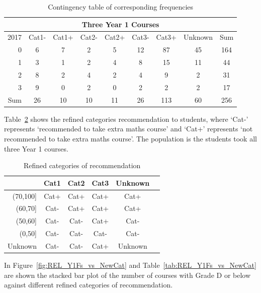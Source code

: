\documentclass[a4paper]{report}
\begin{document}
\begin{table}[H]
  \centering
  \begin{tabular}{r|ccccccc|c}
    \hline
    \multicolumn{9}{c}{\textbf{Three Year 1 Courses}} \\
    \hline
   2017 & Cat1- & Cat1+ & Cat2- & Cat2+ & Cat3- & Cat3+ & Unknown & Sum \\ 
    \hline
  0 & 6 & 7 & 2 & 5 & 12 & 87 & 45 & 164 \\ 
    1 & 3 & 1 & 2 & 4 & 8 & 15 & 11 & 44 \\ 
    2 & 8 & 2 & 4 & 2 & 4 & 9 & 2 & 31 \\ 
    3 & 9 & 0 & 2 & 0 & 2 & 2 & 2 & 17 \\ 
    \hline
    Sum & 26 & 10 & 10 & 11 & 26 & 113 & 60 & 256 \\ 
     \hline
  \end{tabular}
  \caption{\label{tab:REL_Y1Fs_vs_NewCat_all}Contingency table of corresponding frequencies}
\end{table}

Table~\ref{tab:REL_refine} shows the refined categories recommendation to students, where `Cat-' represents `recommended to take extra maths course' and `Cat+' represents `not recommended to take extra maths course'. The population is the students took all three Year 1 courses. 

\begin{table}[ht]
  \centering
  \begin{tabular}{r|ccccc}
    \hline
    & Cat1 & Cat2 & Cat3 & Unknown \\ 
   \hline
   (70,100] & Cat+ & Cat+ & Cat+ & Cat+  \\ 
     (60,70] & Cat- & Cat+ & Cat+ & Cat+  \\ 
     (50,60] & Cat- & Cat- & Cat+ & Cat-  \\ 
     (0,50] & Cat- & Cat- & Cat- & Cat-  \\ 
    Unknown & Cat- & Cat- & Cat+ & Unknown \\
      \hline
  \end{tabular}
  \caption{\label{tab:REL_refine}Refined categories of recommendation}
\end{table}

In Figure~\ref{fig:REL_Y1Fs_vs_NewCat} and Table~\ref{tab:REL_Y1Fs_vs_NewCat} are shown the stacked bar plot of the number of courses with Grade D or below against different refined categories of recommendation. 
\end{document}
